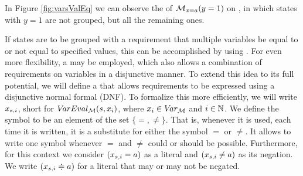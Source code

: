 \documentclass[preview]{standalone}
\begin{document}
\begin{exmp}
	In Figure \ref{fig:varsValEq} we can observe the \viewN of $\viewparamvalueseq(y=1)$ on \chgph, in which states with $y=1$ are not grouped, but all the remaining ones.
\end{exmp}



If states are to be grouped with a requirement that multiple variables be equal to or not equal to specified values, this can be accomplished by using \parllcompN. For even more flexibility, a \viewN may be employed, which also allows a combination of requirements on variables in a disjunctive manner. To extend this idea to its full potential, we will define a \viewN that allows requirements to be expressed using a disjunctive normal formal (DNF). To formalize this \viewN more efficiently, we will write $\varstate[,i]$, short for $\vareval(\state, \var_i)$, where $x_i \in \vars$ and $i \in \natnums$. We define the symbol \eqorneq to be an element of the set $\{=,\neq\}$. That is, whenever it is used, each time it is written, it is a substitute for either the symbol $=$ or $\neq$. It allows to write one symbol whenever $=$ and $\neq$ could or should be possible. Furthermore, for this context we consider $(\varstate[,i] = \varval)$ as a literal and $(\varstate[,i] \neq \varval)$ as its negation. We write $(\varstate[,i] \eqorneq \varval)$ for a literal that may or may not be negated.
\end{document}
